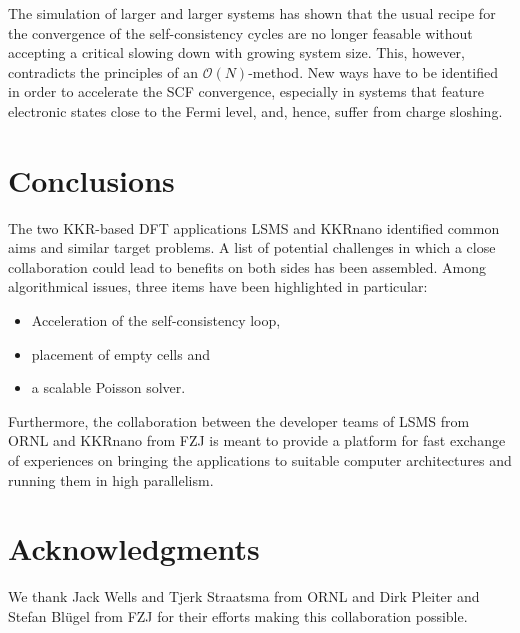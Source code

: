 \documentclass{llncs}
\def\KKRnano{{KKRnano}}
\def\LSMS{{LSMS}}
\begin{document}
The simulation of larger and larger systems has shown that the usual recipe for the
convergence of the self-consistency cycles are no longer feasable without accepting a critical
slowing down with growing system size. 
This, however, contradicts the principles of an $\mathcal O(N)$-method.
New ways have to be identified in order to accelerate the SCF convergence, especially in systems
that feature electronic states close to the Fermi level, and, hence, suffer from charge sloshing.


\section{Conclusions}\label{section:summary}

The two KKR-based DFT applications \LSMS{} and \KKRnano{} identified common aims and similar target problems.
A list of potential challenges in which a close collaboration could lead to benefits on both sides has been assembled. 
Among algorithmical issues, three items have been highlighted in particular: 
\begin{itemize}
 \item Acceleration of the self-consistency loop,
 \item placement of empty cells and
 \item a scalable Poisson solver.
\end{itemize}
Furthermore, the collaboration between the developer teams of 
\LSMS{} from ORNL 
and
\KKRnano{} from FZJ
is meant to provide a platform for fast exchange of experiences on
bringing the applications to suitable computer architectures and running them in high parallelism.

\section*{Acknowledgments}
We thank Jack Wells and Tjerk Straatsma from ORNL and Dirk Pleiter and Stefan Bl\"ugel from FZJ 
for their efforts making this collaboration possible.

\end{document}
